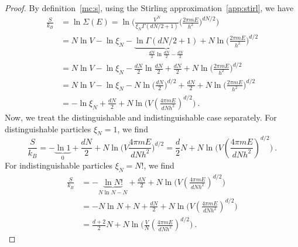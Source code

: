     \begin{proof}
        By definition~\eqref{mc:s}, using the Stirling approximation~\eqref{app:stirl}, we have
        \begin{equation*}
        \begin{aligned}
            \frac{S}{k_B} & = \ln \Sigma (E) = \ln \Big ( \frac{V^{N}}{\xi_N \Gamma(dN/2 + 1)} \Big ( \frac{2 \pi m E}{h^2}\Big)^{dN/2} \Big ) \\ & =  N \ln V - \ln \xi_N - \underbrace{\ln \Gamma (dN/2 + 1)}_{\frac{dN}{2} \ln \frac{dN}{2} - \frac{dN}{2}} + N \ln \Big (\frac{2 \pi m E}{h^2} \Big )^{d/2} \\ & = N \ln V - \ln \xi_N - \frac{dN}{2} \ln \frac{dN}{2} + \frac{dN}{2} + N \ln \Big (\frac{2 \pi m E}{h^2} \Big )^{d/2} \\ & = N \ln V - \ln \xi_N - N \ln \Big(\frac{dN}{2} \Big)^{d/2} + \frac{dN}{2} + N \ln \Big (\frac{2 \pi m E}{h^2} \Big )^{d/2} \\ & = - \ln \xi_N + \frac{dN}{2} + N \ln \Big ( V (\frac{4 \pi m E}{d N h^2})^{d/2} \Big) ~.
        \end{aligned}
        \end{equation*} 
        Now, we treat the distinguishable and indistinguishable case separately. For distinguishable particles $\xi_N = 1$, we find
        \begin{equation*}
            \frac{S}{k_B} = - \underbrace{\ln 1}_0 + \frac{dN}{2} + N \ln \Big (V \frac{4 \pi m E}{dNh^2} \Big )^{d/2} = \frac{d}{2} N + N \ln \Big ( V (\frac{4 \pi m E}{d N h^2})^{d/2} \Big) ~.
        \end{equation*}
        For indistinguishable particles $\xi_N = N!$, we find
        \begin{equation*}
        \begin{aligned}
            \frac{S}{k_B} & = - \underbrace{\ln N!}_{N \ln N - N} + \frac{dN}{2} + N \ln \Big ( V (\frac{4 \pi m E}{d N h^2})^{d/2} \Big) \\ & = - N \ln N + N + \frac{dN}{2} + N \ln \Big ( V (\frac{4 \pi m E}{d N h^2})^{d/2} \Big) \\ & = \frac{d + 2}{2} N + N \ln \Big ( \frac{V}{N} (\frac{4 \pi m E}{d N h^2})^{d/2} \Big) ~.
        \end{aligned}
        \end{equation*}
    \end{proof}

